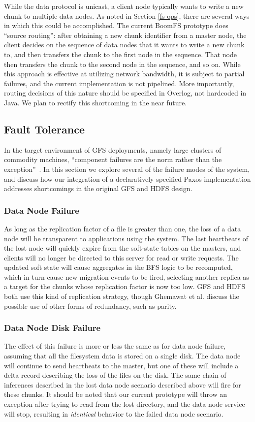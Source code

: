 \documentclass{article}
\begin{document}
While the data protocol is unicast, a client node typically wants to
write a new chunk to multiple data nodes. As noted in Section
\ref{fs-ops}, there are several ways in which this could be
accomplished. The current BoomFS prototype does ``source routing'':
after obtaining a new chunk identifier from a master node, the client
decides on the sequence of data nodes that it wants to write a new
chunk to, and then transfers the chunk to the first node in the
sequence. That node then transfers the chunk to the second node in the
sequence, and so on. While this approach is effective at utilizing
network bandwidth, it is subject to partial failures, and the current
implementation is not pipelined. More importantly, routing decisions
of this nature should be specified in Overlog, not hardcoded in
Java. We plan to rectify this shortcoming in the near future.

\subsection{Fault Tolerance}
In the target environment of GFS deployments, namely large clusters of
commodity machines, ``component failures are the norm rather than the
exception''~\cite{gfs}.  In this section we explore several of the
failure modes of the system, and discuss how our integration of a
declaratively-specified Paxos implementation addresses shortcomings in
the original GFS and HDFS design.

\subsubsection{Data Node Failure}
As long as the replication factor of a file is greater than one, the
loss of a data node will be transparent to applications using the
system.  The last heartbeats of the lost node will quickly expire from
the soft-state tables on the masters, and clients will no longer be
directed to this server for read or write requests.  The updated soft
state will cause aggregates in the BFS logic to be recomputed, which
in turn cause new migration events to be fired, selecting another
replica as a target for the chunks whose replication factor is now too
low.  GFS and HDFS both use this kind of replication strategy, though
Ghemawat et al. discuss the possible use of other forms of redundancy,
such as parity.

\subsubsection{Data Node Disk Failure}
The effect of this failure is more or less the same as for data node
failure, assuming that all the filesystem data is stored on a single
disk.  The data node will continue to send heartbeats to the master,
but one of these will include a delta record describing the loss of
the files on the disk.  The same chain of inferences described in the
lost data node scenario described above will fire for these chunks.
It should be noted that our current prototype will throw an exception
after trying to read from the lost directory, and the data node
service will stop, resulting in \emph{identical} behavior to the
failed data node scenario.
\end{document}
